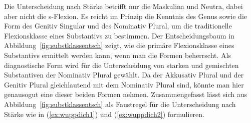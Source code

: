 \begin{table}[!htbp]
  \caption{Traditionelle Flexionsklassen der Substantive}
  \label{tab:tradflexsubst}
\end{table}

Die Unterscheidung nach Stärke betrifft nur die Maskulina und Neutra, dabei aber nicht die s-Flexion.
Es reicht im Prinzip die Kenntnis des Genus sowie die Form des Genitiv Singular und des Nominativ Plural, um die traditionelle Flexionsklasse eines Substantivs zu bestimmen.
Der Entscheidungsbaum in Abbildung~\ref{fig:substklassentsch} zeigt, wie die primäre Flexionsklasse eines Substantivs ermittelt werden kann, wenn man die Formen beherrscht.
Als diagnostische Form wird für die Unterscheidung von starken und gemischten Substantiven der Nominativ Plural gewählt.
Da der Akkusativ Plural und der Genitiv Plural gleichlautend mit dem Nominativ Plural sind, könnte man hier genausogut eine dieser beiden Formen nehmen.
Zusammengefasst lässt sich aus Abbildung~\ref{fig:substklassentsch} als Faustregel für die Unterscheidung nach Stärke wie in (\ref{ex:wuppdich1}) und (\ref{ex:wuppdich2}) formulieren.

